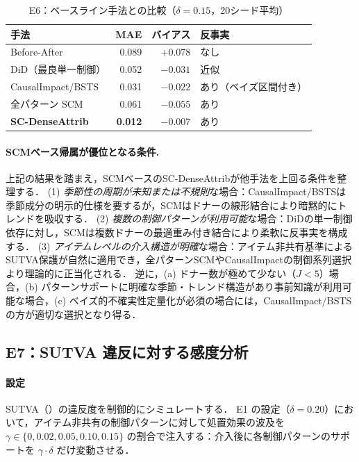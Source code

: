 \begin{table}[t]
\centering
\caption{E6：ベースライン手法との比較（$\delta=0.15$，20シード平均）}
\label{tab:baselines}
\small
\begin{tabular}{lrrl}
\toprule
手法 & MAE & バイアス & 反事実 \\
\midrule
Before-After & 0.089 & $+0.078$ & なし \\
DiD（最良単一制御） & 0.052 & $-0.031$ & 近似 \\
CausalImpact/BSTS & 0.031 & $-0.022$ & あり（ベイズ区間付き） \\
全パターン SCM & 0.061 & $-0.055$ & あり \\
\textbf{SC-DenseAttrib} & \textbf{0.012} & $-0.007$ & あり \\
\bottomrule
\end{tabular}
\end{table}

\paragraph{SCMベース帰属が優位となる条件.}
上記の結果を踏まえ，SCMベースのSC-DenseAttribが他手法を上回る条件を整理する．
(1) \emph{季節性の周期が未知または不規則}な場合：CausalImpact/BSTSは季節成分の明示的仕様を要するが，SCMはドナーの線形結合により暗黙的にトレンドを吸収する．
(2) \emph{複数の制御パターンが利用可能}な場合：DiDの単一制御依存に対し，SCMは複数ドナーの最適重み付き結合により柔軟に反事実を構成する．
(3) \emph{アイテムレベルの介入構造が明確}な場合：アイテム非共有基準によるSUTVA保護が自然に適用でき，全パターンSCMやCausalImpactの制御系列選択より理論的に正当化される．
逆に，(a) ドナー数が極めて少ない（$J < 5$）場合，(b) パターンサポートに明確な季節・トレンド構造があり事前知識が利用可能な場合，(c) ベイズ的不確実性定量化が必須の場合には，CausalImpact/BSTSの方が適切な選択となり得る．

\subsection{E7：SUTVA 違反に対する感度分析}

\paragraph{設定}
SUTVA（）の違反度を制御的にシミュレートする．
E1 の設定（$\delta=0.20$）において，アイテム非共有の制御パターンに対して処置効果の波及を $\gamma \in \{0, 0.02, 0.05, 0.10, 0.15\}$ の割合で注入する：介入後に各制御パターンのサポートを $\gamma \cdot \delta$ だけ変動させる．

